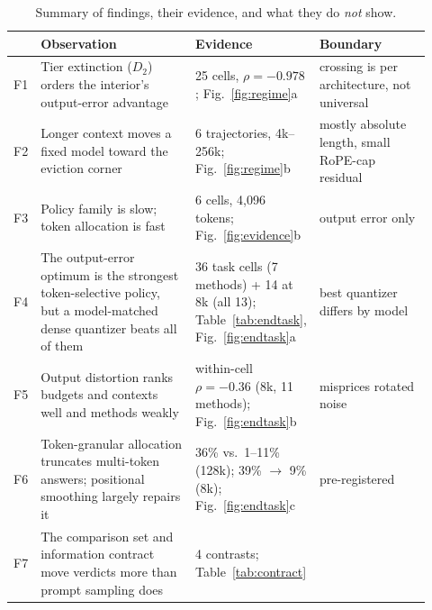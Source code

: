 \documentclass{article}
\theoremstyle{definition}
\begin{document}
\begin{table}[t]
\centering
\small
\setlength{\tabcolsep}{4pt}
\caption{Summary of findings, their evidence, and what they do \emph{not} show.}
\label{tab:findings}
\begin{tabular}{@{}p{0.03\linewidth}p{0.40\linewidth}p{0.20\linewidth}p{0.29\linewidth}@{}}
\toprule
& \textbf{Observation} & \textbf{Evidence} & \textbf{Boundary} \\
\midrule
F1 & Tier extinction ($D_2$) orders the interior's output-error advantage & 25 cells, $\rho=-0.978$; Fig.~\ref{fig:regime}a & crossing is per architecture, not universal \\
F2 & Longer context moves a fixed model toward the eviction corner & 6 trajectories, 4k--256k; Fig.~\ref{fig:regime}b & mostly absolute length, small RoPE-cap residual \\
F3 & Policy family is slow; token allocation is fast & 6 cells, 4,096 tokens; Fig.~\ref{fig:evidence}b & output error only \\
F4 & The output-error optimum is the strongest token-selective policy, but a model-matched dense quantizer beats all of them & 36 task cells (7 methods) + 14 at 8k (all 13); Table~\ref{tab:endtask}, Fig.~\ref{fig:endtask}a & best quantizer differs by model \\ %
F5 & Output distortion ranks budgets and contexts well and methods weakly & within-cell $\rho=-0.36$ (8k, 11 methods); Fig.~\ref{fig:endtask}b & misprices rotated noise \\ %
F6 & Token-granular allocation truncates multi-token answers; positional smoothing largely repairs it & 36\% vs.\ 1--11\% (128k); 39\% $\to$ 9\% (8k); Fig.~\ref{fig:endtask}c & pre-registered \\ %
F7 & The comparison set and information contract move verdicts more than prompt sampling does & 4 contrasts; Table~\ref{tab:contract} & \\ %
\bottomrule
\end{tabular}
\vspace{-2mm}
\end{table}
\end{document}
